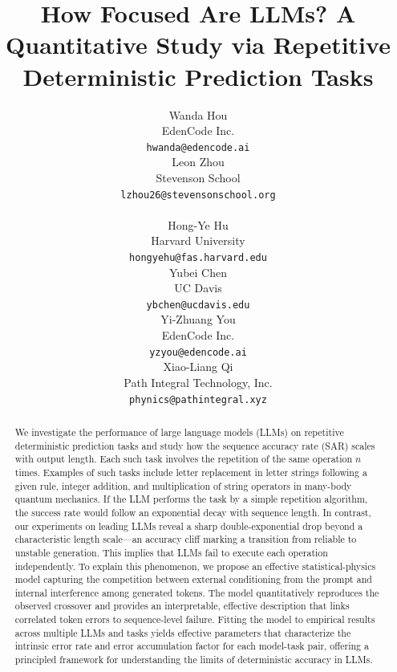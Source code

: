 \documentclass{article}
\title{How Focused Are LLMs? A Quantitative Study via Repetitive Deterministic Prediction Tasks}
\author{
  Wanda Hou \\
  EdenCode Inc. \\
  \texttt{hwanda@edencode.ai} \\
  \And
  Leon Zhou \\
  Stevenson School \\
  \texttt{lzhou26@stevensonschool.org} \\
  \\
  \And
  Hong-Ye Hu \\
  Harvard University \\
  \texttt{hongyehu@fas.harvard.edu} \\
  \And
  Yubei Chen\\
  UC Davis \\
  \texttt{ybchen@ucdavis.edu} \\
  \And
  Yi-Zhuang You \\
  EdenCode Inc. \\
  \texttt{yzyou@edencode.ai} \\
  \And
  Xiao-Liang Qi \\
 Path Integral Technology, Inc. \\
  \texttt{phynics@pathintegral.xyz} \\
}
\theoremstyle{plain}
\begin{document}
\maketitle


\begin{abstract}
We investigate the performance of large language models (LLMs) on repetitive deterministic prediction tasks and study how the sequence accuracy rate (SAR) scales with output length. Each such task involves the repetition of the same operation $n$ times. Examples of such tasks include letter replacement in letter strings following a given rule, integer addition, and multiplication of string operators in many-body quantum mechanics. If the LLM performs the task by a simple repetition algorithm, the success rate would follow an exponential decay with sequence length. In contrast, our experiments on leading LLMs reveal a sharp double-exponential drop beyond a characteristic length scale—an accuracy cliff marking a transition from reliable to unstable generation. This implies that LLMs fail to execute each operation independently. To explain this phenomenon, we propose an effective statistical-physics model capturing the competition between external conditioning from the prompt and internal interference among generated tokens. The model quantitatively reproduces the observed crossover and provides an interpretable, effective description that links correlated token errors to sequence-level failure. Fitting the model to empirical results across multiple LLMs and tasks yields effective parameters that characterize the intrinsic error rate and error accumulation factor for each model-task pair, offering a principled framework for understanding the limits of deterministic accuracy in LLMs.

\end{abstract}
\end{document}
